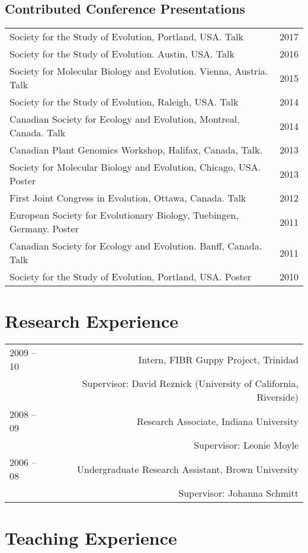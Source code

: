 \documentclass[letterpaper]{article}
\begin{document}
\subsection*{Contributed Conference Presentations}
\begin{tabular}{MN}
Society for the Study of Evolution, Portland, USA. Talk & 2017 \\
Society for the Study of Evolution. Austin, USA. Talk  & 2016\\
Society for Molecular Biology and Evolution. Vienna, Austria. Talk & 2015\\ 
Society for the Study of Evolution, Raleigh, USA. Talk & 2014 \\
Canadian Society for Ecology and Evolution, Montreal, Canada. Talk & 2014\\
Canadian Plant Genomics Workshop, Halifax, Canada, Talk. & 2013\\
Society for Molecular Biology and Evolution, Chicago, USA. Poster & 2013\\
First Joint Congress in Evolution, Ottawa, Canada. Talk & 2012\\
European Society for Evolutionary Biology, Tuebingen, Germany. Poster & 2011\\
Canadian Society for Ecology and Evolution. Banff, Canada. Talk & 2011 \\
Society for the Study of Evolution, Portland, USA. Poster & 2010\\
\end{tabular}

\section*{Research Experience}
\begin{tabular}{LR}
2009 -- 10 & Intern, FIBR Guppy Project, Trinidad \\
&Supervisor: David Reznick (University of California, Riverside)\\ [0.5ex]
2008 -- 09 & Research Associate, Indiana University \\
& Supervisor: Leonie Moyle \\ [0.5ex]
2006 -- 08 & Undergraduate Research Assistant, Brown University \\
& Supervisor: Johanna Schmitt
\end{tabular}

\section*{Teaching Experience}
\end{document}
